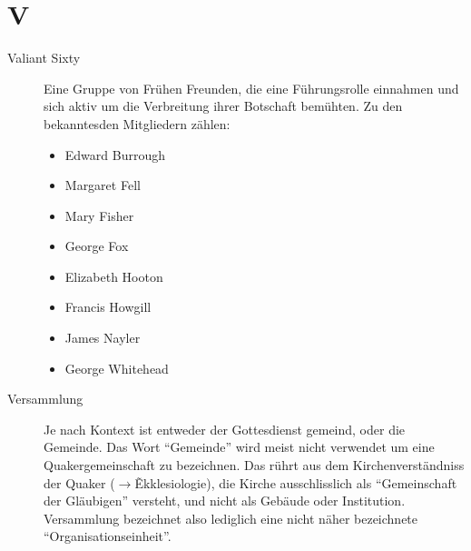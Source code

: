 \section*{V}

\articlesize

\begin{description}

 \item[Valiant Sixty] Eine Gruppe von Frühen Freunden, die eine Führungsrolle einnahmen und sich aktiv um die Verbreitung ihrer Botschaft bemühten. Zu den bekanntesden Mitgliedern zählen:
 
 \begin{itemize}
  \item Edward Burrough
  \item Margaret Fell
  \item Mary Fisher
  \item George Fox
  \item Elizabeth Hooton
  \item Francis Howgill
  \item James Nayler
  \item George Whitehead
 \end{itemize}

 \item[Versammlung] Je nach Kontext ist entweder der Gottesdienst gemeind, oder die Gemeinde. Das Wort "`Gemeinde"' wird meist nicht verwendet um eine Quakergemeinschaft zu bezeichnen. Das rührt aus dem Kirchenverständniss der Quaker ($\to$\~Ekklesiologie), die Kirche ausschlisslich als "`Gemeinschaft der Gläubigen"' versteht, und nicht als Gebäude oder Institution. Versammlung bezeichnet also lediglich eine nicht näher bezeichnete "`Organisationseinheit"'.
 
 \end{description}

\normalsize
